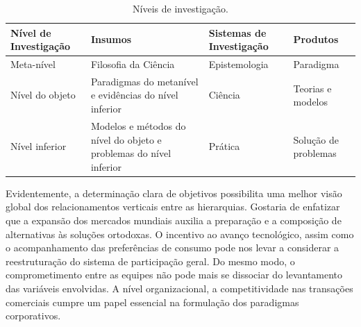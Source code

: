 \begin{table}[htb]
\ABNTEXfontereduzida
\caption[Níveis de investigação]{Níveis de investigação.}
\label{tab-nivinv}
\begin{tabular}{p{2.6cm}|p{6.0cm}|p{2.25cm}|p{3.40cm}}
   \textbf{Nível de Investigação} & \textbf{Insumos}  & \textbf{Sistemas de Investigação}  & \textbf{Produtos}  \\
    \hline
    Meta-nível & Filosofia\index{filosofia} da Ciência  & Epistemologia &
    Paradigma  \\
    \hline
    Nível do objeto & Paradigmas do metanível e evidências do nível inferior &
    Ciência  & Teorias e modelos \\
    \hline
    Nível inferior & Modelos e métodos do nível do objeto e problemas do nível inferior & Prática & Solução de problemas  \\
\end{tabular}
\end{table}

Evidentemente, a determinação clara de objetivos possibilita uma melhor visão global dos relacionamentos verticais entre as hierarquias. Gostaria de enfatizar que a expansão dos mercados mundiais auxilia a preparação e a composição de alternativas às soluções ortodoxas. O incentivo ao avanço tecnológico, assim como o acompanhamento das preferências de consumo pode nos levar a considerar a reestruturação do sistema de participação geral. Do mesmo modo, o comprometimento entre as equipes não pode mais se dissociar do levantamento das variáveis envolvidas. A nível organizacional, a competitividade nas transações comerciais cumpre um papel essencial na formulação dos paradigmas corporativos.

\begin{table}[htb]
\end{table}

